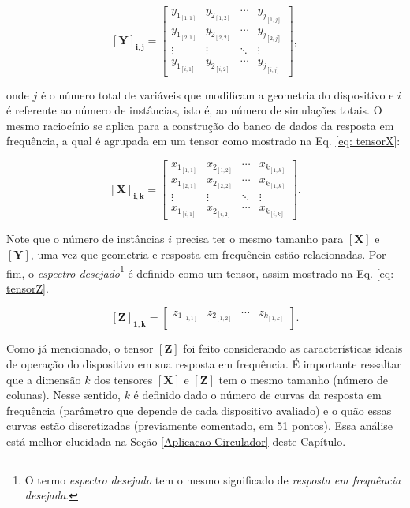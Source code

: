 \begin{equation}
\label{eq: tensorY}
\mathbf{[Y]_{i,j}} =
\begin{bmatrix}
y_{1_{[1,1]}} & y_{2_{[1,2]}} & \cdots & y_{j_{[1,j]}}\\
y_{1_{[2,1]}} & y_{2_{[2,2]}} & \cdots & y_{j_{[2,j]}}\\
\vdots  & \vdots  & \ddots & \vdots\\
y_{1_{[i,1]}} & y_{2_{[i,2]}} & \cdots & y_{j_{[i,j]}}
\end{bmatrix},
\end{equation}

\noindent
onde $j$ é o número total de variáveis que modificam a geometria do dispositivo e $i$ é referente ao número de instâncias, isto é, ao número de simulações totais. O mesmo raciocínio se aplica para a construção do banco de dados da resposta em frequência, a qual é agrupada em um tensor como mostrado na Eq. \ref{eq: tensorX}:

\begin{equation}
\label{eq: tensorX}
\mathbf{[X]_{i,k}} =
\begin{bmatrix}
x_{1_{[1,1]}} & x_{2_{[1,2]}} & \cdots & x_{k_{[1,k]}}\\
x_{1_{[2,1]}} & x_{2_{[2,2]}} & \cdots & x_{k_{[1,k]}}\\
\vdots  & \vdots  & \ddots & \vdots\\
x_{1_{[i,1]}} & x_{2_{[i,2]}} & \cdots & x_{k_{[i,k]}}
\end{bmatrix}.
\end{equation}

Note que o número de instâncias $i$ precisa ter o mesmo tamanho para $\mathbf{[X]}$ e $\mathbf{[Y]}$, uma vez que geometria e resposta em frequência estão relacionadas. Por fim, o \textit{espectro desejado}\footnote{O termo \textit{espectro desejado} tem o mesmo significado de \textit{resposta em frequência desejada}.} é definido como um tensor, assim mostrado na Eq. \ref{eq: tensorZ}.

\begin{equation}
\label{eq: tensorZ}
\mathbf{[Z]_{1,k}} =
\begin{bmatrix}
z_{1_{[1,1]}} & z_{2_{[1,2]}} & \cdots & z_{k_{[1,k]}}\\
\end{bmatrix}.
\end{equation}

Como já mencionado, o tensor $\mathbf{[Z]}$ foi feito considerando as características ideais de operação do dispositivo em sua resposta em frequência. É importante ressaltar que a dimensão $k$ dos tensores $\mathbf{[X]}$ e $\mathbf{[Z]}$ tem o mesmo tamanho (número de colunas). Nesse sentido, $k$ é definido dado o número de curvas da resposta em frequência (parâmetro que depende de cada dispositivo avaliado) e o quão essas curvas estão discretizadas (previamente comentado, em 51 pontos). Essa análise está melhor elucidada na Seção \ref{Aplicacao Circulador} deste Capítulo.

